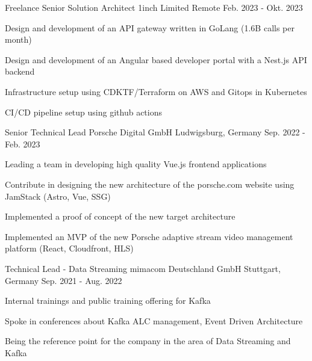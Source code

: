 
\begin{cventries}

  \cventry
    {Freelance Senior Solution Architect} %
    {1inch Limited} %
    {Remote} %
    {Feb. 2023 - Okt. 2023} %
    {
      \begin{cvitems} %
        \item {Design and development of an API gateway written in GoLang (1.6B calls per month)}
        \item {Design and development of an Angular based developer portal with a Nest.js API backend}
        \item {Infrastructure setup using CDKTF/Terraform on AWS and Gitops in Kubernetes}
        \item {CI/CD pipeline setup using github actions}
      \end{cvitems}
    }

  \cventry
    {Senior Technical Lead} %
    {Porsche Digital GmbH} %
    {Ludwigsburg, Germany} %
    {Sep. 2022 - Feb. 2023} %
    {
      \begin{cvitems} %
        \item {Leading a team in developing high quality Vue.js frontend applications}
        \item {Contribute in designing the new architecture of the porsche.com website using JamStack (Astro, Vue, SSG)}
        \item {Implemented a proof of concept of the new target architecture}
        \item {Implemented an MVP of the new Porsche adaptive stream video management platform (React, Cloudfront, HLS)}
      \end{cvitems}
    }

  \cventry
    {Technical Lead - Data Streaming} %
    {mimacom Deutschland GmbH} %
    {Stuttgart, Germany} %
    {Sep. 2021 - Aug. 2022} %
    {
      \begin{cvitems} %
        \item {Internal trainings and public training offering for Kafka}
        \item {Spoke in conferences about Kafka ALC management, Event Driven Architecture}
        \item {Being the reference point for the company in the area of Data Streaming and Kafka}
      \end{cvitems}
    }


\end{cventries}
